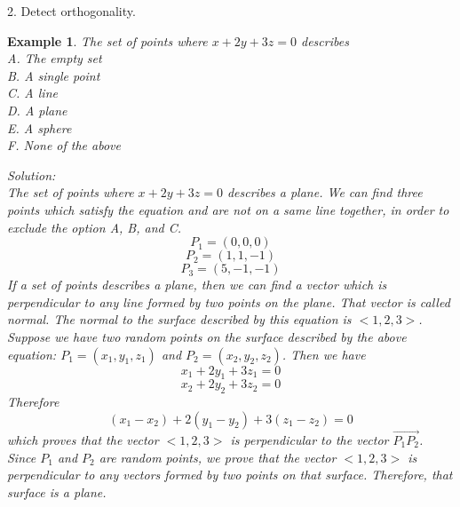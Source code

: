 \documentclass{article}
\newtheorem{example}{Example}
\begin{document}
2. Detect orthogonality.

\begin{example}
The set of points where $x + 2y + 3z = 0$ describes \\
A. The empty set \\
B. A single point \\
C. A line \\
D. A plane \\
E. A sphere \\
F. None of the above

Solution:\\
The set of points where $x + 2y + 3z = 0$ describes a plane. We can find three
points which satisfy the equation and are not on a same line together, in order
to exclude the option A, B, and C.
\[ P_1 = (0, 0, 0) \]
\[ P_2 = (1, 1, -1) \]
\[ P_3 = (5, -1, -1) \]
If a set of points describes a plane, then we can find a vector which is
perpendicular to any line formed by two points on the plane. That vector is
called normal. The normal to the surface described by this equation is
$<1, 2, 3>$. Suppose we have two random points on the surface described by the
above equation: $P_{1} = (x_{1}, y_{1}, z_{1})$ and $P_{2} = (x_{2}, y_{2},
z_{2})$. Then we have
\[ x_{1} + 2y_{1} + 3z_{1} = 0 \]
\[ x_{2} + 2y_{2} + 3z_{2} = 0 \]
Therefore
\[ (x_{1} - x_{2}) + 2(y_{1} - y_{2}) + 3(z_{1} - z_{2}) = 0 \]
which proves that the vector $<1, 2, 3>$ is perpendicular to the vector
$\vec{P_{1}P_{2}}$. Since $P_{1}$ and $P_{2}$ are random points, we prove that
the vector $<1, 2, 3>$ is perpendicular to any vectors formed by two points on
that surface. Therefore, that surface is a plane.
\end{example}
\end{document}
